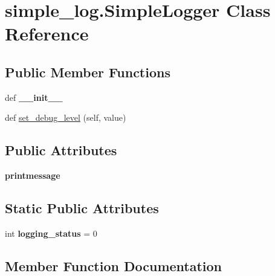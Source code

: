 \hypertarget{classsimple__log_1_1_simple_logger}{}\section{simple\+\_\+log.\+Simple\+Logger Class Reference}
\label{classsimple__log_1_1_simple_logger}
\subsection*{Public Member Functions}
\begin{DoxyCompactItemize}
\item 
\hypertarget{classsimple__log_1_1_simple_logger_adf6f4a11fe20be4cc9ca700a2ee8e816}{}def {\bfseries \+\_\+\+\_\+init\+\_\+\+\_\+}\label{classsimple__log_1_1_simple_logger_adf6f4a11fe20be4cc9ca700a2ee8e816}

\item 
def \hyperlink{classsimple__log_1_1_simple_logger_a716f168beed60164e9d2ccd6e7111412}{set\+\_\+debug\+\_\+level} (self, value)
\end{DoxyCompactItemize}
\subsection*{Public Attributes}
\begin{DoxyCompactItemize}
\item 
\hypertarget{classsimple__log_1_1_simple_logger_ab97878571701a768a09b5c2b96f45995}{}{\bfseries printmessage}\label{classsimple__log_1_1_simple_logger_ab97878571701a768a09b5c2b96f45995}

\end{DoxyCompactItemize}
\subsection*{Static Public Attributes}
\begin{DoxyCompactItemize}
\item 
\hypertarget{classsimple__log_1_1_simple_logger_a14da51c0946b94047d1c54e92a97b196}{}int {\bfseries logging\+\_\+status} = 0\label{classsimple__log_1_1_simple_logger_a14da51c0946b94047d1c54e92a97b196}

\end{DoxyCompactItemize}


\subsection{Member Function Documentation}
\hypertarget{classsimple__log_1_1_simple_logger_a716f168beed60164e9d2ccd6e7111412}{}
